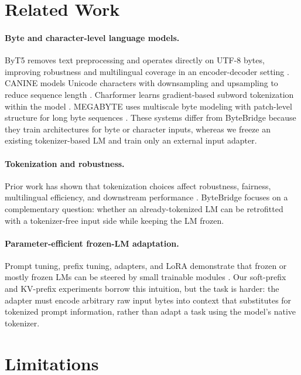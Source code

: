 \documentclass{article}
\newcommand{\bb}{ByteBridge}
\begin{document}
\section{Related Work}

\paragraph{Byte and character-level language models.}
ByT5 removes text preprocessing and operates directly on UTF-8 bytes, improving robustness and multilingual coverage in an encoder-decoder setting \citep{xue2022byt5}. CANINE models Unicode characters with downsampling and upsampling to reduce sequence length \citep{clark2022canine}. Charformer learns gradient-based subword tokenization within the model \citep{tay2022charformer}. MEGABYTE uses multiscale byte modeling with patch-level structure for long byte sequences \citep{yu2023megabyte}. These systems differ from \bb{} because they train architectures for byte or character inputs, whereas we freeze an existing tokenizer-based LM and train only an external input adapter.

\paragraph{Tokenization and robustness.}
Prior work has shown that tokenization choices affect robustness, fairness, multilingual efficiency, and downstream performance \citep{bostrom2020bytepair,rust2021good,mielke2021between}. \bb{} focuses on a complementary question: whether an already-tokenized LM can be retrofitted with a tokenizer-free input side while keeping the LM frozen.

\paragraph{Parameter-efficient frozen-LM adaptation.}
Prompt tuning, prefix tuning, adapters, and LoRA demonstrate that frozen or mostly frozen LMs can be steered by small trainable modules \citep{li2021prefixtuning,lester2021prompttuning,houlsby2019adapter,hu2022lora}. Our soft-prefix and KV-prefix experiments borrow this intuition, but the task is harder: the adapter must encode arbitrary raw input bytes into context that substitutes for tokenized prompt information, rather than adapt a task using the model's native tokenizer.

\section{Limitations}
\end{document}
